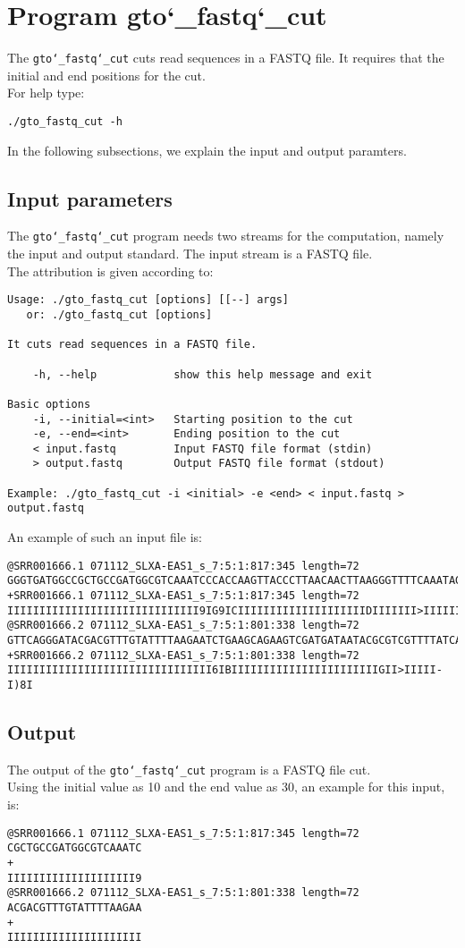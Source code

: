 \section{Program gto\char`_fastq\char`_cut}
The \texttt{gto\char`_fastq\char`_cut} cuts read sequences in a FASTQ file. It requires that the initial and end positions for the cut.\\
For help type:
\begin{lstlisting}
./gto_fastq_cut -h
\end{lstlisting}
In the following subsections, we explain the input and output paramters.

\subsection*{Input parameters}

The \texttt{gto\char`_fastq\char`_cut} program needs two streams for the computation, namely the input and output standard. The input stream is a FASTQ file.\\
The attribution is given according to:
\begin{lstlisting}
Usage: ./gto_fastq_cut [options] [[--] args]
   or: ./gto_fastq_cut [options]

It cuts read sequences in a FASTQ file.

    -h, --help            show this help message and exit

Basic options
    -i, --initial=<int>   Starting position to the cut
    -e, --end=<int>       Ending position to the cut
    < input.fastq         Input FASTQ file format (stdin)
    > output.fastq        Output FASTQ file format (stdout)

Example: ./gto_fastq_cut -i <initial> -e <end> < input.fastq > output.fastq
\end{lstlisting}
An example of such an input file is:
\begin{lstlisting}
@SRR001666.1 071112_SLXA-EAS1_s_7:5:1:817:345 length=72
GGGTGATGGCCGCTGCCGATGGCGTCAAATCCCACCAAGTTACCCTTAACAACTTAAGGGTTTTCAAATAGA
+SRR001666.1 071112_SLXA-EAS1_s_7:5:1:817:345 length=72
IIIIIIIIIIIIIIIIIIIIIIIIIIIIII9IG9ICIIIIIIIIIIIIIIIIIIIIDIIIIIII>IIIIII/
@SRR001666.2 071112_SLXA-EAS1_s_7:5:1:801:338 length=72
GTTCAGGGATACGACGTTTGTATTTTAAGAATCTGAAGCAGAAGTCGATGATAATACGCGTCGTTTTATCAT
+SRR001666.2 071112_SLXA-EAS1_s_7:5:1:801:338 length=72
IIIIIIIIIIIIIIIIIIIIIIIIIIIIIIII6IBIIIIIIIIIIIIIIIIIIIIIIIGII>IIIII-I)8I
\end{lstlisting}

\subsection*{Output}
The output of the \texttt{gto\char`_fastq\char`_cut} program is a FASTQ file cut.\\
Using the initial value as 10 and the end value as 30, an example for this input, is:
\begin{lstlisting}
@SRR001666.1 071112_SLXA-EAS1_s_7:5:1:817:345 length=72
CGCTGCCGATGGCGTCAAATC
+
IIIIIIIIIIIIIIIIIIII9
@SRR001666.2 071112_SLXA-EAS1_s_7:5:1:801:338 length=72
ACGACGTTTGTATTTTAAGAA
+
IIIIIIIIIIIIIIIIIIIII
\end{lstlisting}